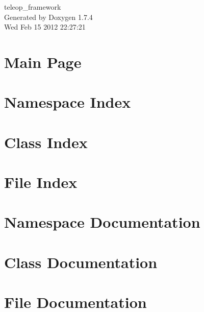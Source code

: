 \documentclass[a4paper]{book}
\begin{document}
\begin{titlepage}
\vspace*{7cm}
\begin{center}
{\Large teleop\_\-framework }\\
\vspace*{1cm}
{\large Generated by Doxygen 1.7.4}\\
\vspace*{0.5cm}
{\small Wed Feb 15 2012 22:27:21}\\
\end{center}
\end{titlepage}
\clearemptydoublepage
{}
\tableofcontents
\clearemptydoublepage
{}
\chapter{Main Page}
\label{index}
\chapter{Namespace Index}

\chapter{Class Index}

\chapter{File Index}

\chapter{Namespace Documentation}

\chapter{Class Documentation}






\chapter{File Documentation}






\printindex
\end{document}
